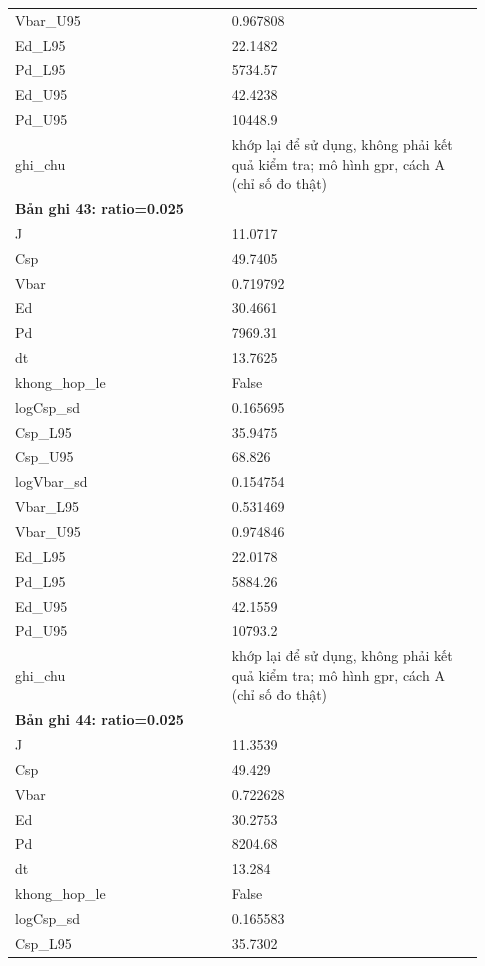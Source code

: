 \begin{longtable}{p{0.43\linewidth}p{0.50\linewidth}}
Vbar\_\allowbreak U95 & 0.967808 \\
Ed\_\allowbreak L95 & 22.1482 \\
Pd\_\allowbreak L95 & 5734.57 \\
Ed\_\allowbreak U95 & 42.4238 \\
Pd\_\allowbreak U95 & 10448.9 \\
ghi\_\allowbreak chu & khớp lại để sử dụng, không phải kết quả kiểm tra; mô hình gpr, cách A (chỉ số đo thật) \\
\midrule
\multicolumn{2}{p{0.95\linewidth}}{\textbf{Bản ghi 43: ratio=0.025}} \\
J & 11.0717 \\
Csp & 49.7405 \\
Vbar & 0.719792 \\
Ed & 30.4661 \\
Pd & 7969.31 \\
dt & 13.7625 \\
khong\_\allowbreak hop\_\allowbreak le & False \\
logCsp\_\allowbreak sd & 0.165695 \\
Csp\_\allowbreak L95 & 35.9475 \\
Csp\_\allowbreak U95 & 68.826 \\
logVbar\_\allowbreak sd & 0.154754 \\
Vbar\_\allowbreak L95 & 0.531469 \\
Vbar\_\allowbreak U95 & 0.974846 \\
Ed\_\allowbreak L95 & 22.0178 \\
Pd\_\allowbreak L95 & 5884.26 \\
Ed\_\allowbreak U95 & 42.1559 \\
Pd\_\allowbreak U95 & 10793.2 \\
ghi\_\allowbreak chu & khớp lại để sử dụng, không phải kết quả kiểm tra; mô hình gpr, cách A (chỉ số đo thật) \\
\midrule
\multicolumn{2}{p{0.95\linewidth}}{\textbf{Bản ghi 44: ratio=0.025}} \\
J & 11.3539 \\
Csp & 49.429 \\
Vbar & 0.722628 \\
Ed & 30.2753 \\
Pd & 8204.68 \\
dt & 13.284 \\
khong\_\allowbreak hop\_\allowbreak le & False \\
logCsp\_\allowbreak sd & 0.165583 \\
Csp\_\allowbreak L95 & 35.7302 \\

\end{longtable}
